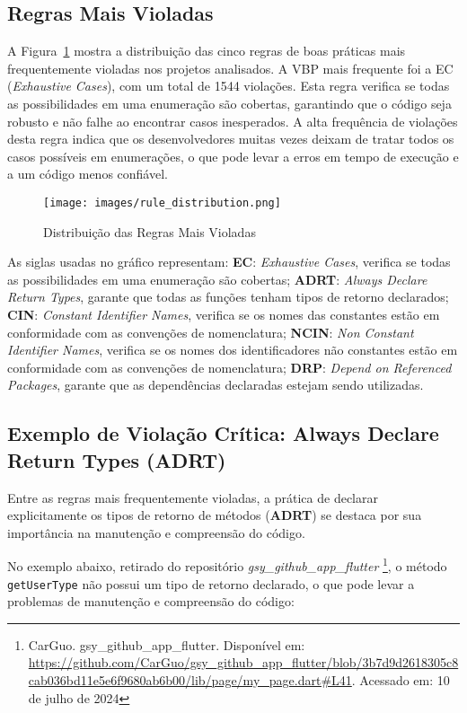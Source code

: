 \documentclass[12pt]{article}
\begin{document}
\subsection{Regras Mais Violadas}
A Figura~\ref{fig:rule_distribution} mostra a distribuição das cinco regras de boas práticas mais frequentemente violadas nos projetos analisados. A VBP mais frequente foi a EC (\textit{Exhaustive Cases}), com um total de 1544 violações. Esta regra verifica se todas as possibilidades em uma enumeração são cobertas, garantindo que o código seja robusto e não falhe ao encontrar casos inesperados. A alta frequência de violações desta regra indica que os desenvolvedores muitas vezes deixam de tratar todos os casos possíveis em enumerações, o que pode levar a erros em tempo de execução e a um código menos confiável.

\begin{figure}[H]
\centering
\texttt{[image: images/rule\_distribution.png]}
\caption{Distribuição das Regras Mais Violadas}
\label{fig:rule_distribution}
\end{figure}

As siglas usadas no gráfico representam: \textbf{EC}: \textit{Exhaustive Cases}, verifica se todas as possibilidades em uma enumeração são cobertas; \textbf{ADRT}: \textit{Always Declare Return Types}, garante que todas as funções tenham tipos de retorno declarados; \textbf{CIN}: \textit{Constant Identifier Names}, verifica se os nomes das constantes estão em conformidade com as convenções de nomenclatura; \textbf{NCIN}: \textit{Non Constant Identifier Names}, verifica se os nomes dos identificadores não constantes estão em conformidade com as convenções de nomenclatura; \textbf{DRP}: \textit{Depend on Referenced Packages}, garante que as dependências declaradas estejam sendo utilizadas.

\subsection{Exemplo de Violação Crítica: Always Declare Return Types (ADRT)}
Entre as regras mais frequentemente violadas, a prática de declarar explicitamente os tipos de retorno de métodos (\textbf{ADRT}) se destaca por sua importância na manutenção e compreensão do código.

No exemplo abaixo, retirado do repositório \textit{gsy\_github\_app\_flutter} \footnote{CarGuo. gsy\_github\_app\_flutter. Disponível em: \url{https://github.com/CarGuo/gsy\_github_app\_flutter/blob/3b7d9d2618305c8cab036bd11e5e6f9680ab6b00/lib/page/my\_page.dart#L41}. Acessado em: 10 de julho de 2024}, o método \texttt{getUserType}  não possui um tipo de retorno declarado, o que pode levar a problemas de manutenção e compreensão do código:
\end{document}
